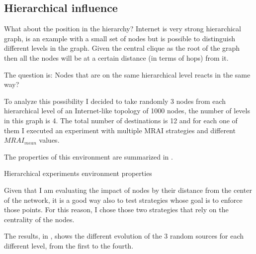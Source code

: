\subsection{Hierarchical influence}
\label{subsec:hierarchical_influence}

What about the position in the hierarchy?
Internet is very strong hierarchical graph, 
is an example with a small set of nodes but is possible to distinguish different levels
in the graph.
Given the central clique as the root of the graph then all the nodes will
be at a certain distance (in terms of hops) from it.

The question is: Nodes that are on the same hierarchical level reacts in the same way?

To analyze this possibility I decided to take randomly \num{3} nodes from each
hierarchical level of an Internet-like topology of \num{1000} nodes, the number
of levels in this graph is \num{4}.
The total number of destinations is \num{12} and for each one of them I executed
an experiment with multiple \ac{MRAI} strategies and different \(MRAI_{mean}\)
values.

The properties of this environment are summarized in .

\begin{table}[h]
	
	\caption{Hierarchical experiments environment properties}
	\label{tbl:hierarchical_properties}
\end{table}

Given that I am evaluating the impact of nodes by their distance from
the center of the network, it is a good way also to test strategies
whose goal is to enforce those points.
For this reason, I chose those two strategies that rely on the centrality of the nodes.

The results, in , shows the different evolution of
the \num{3} random sources for each different level, from the first to the fourth.

